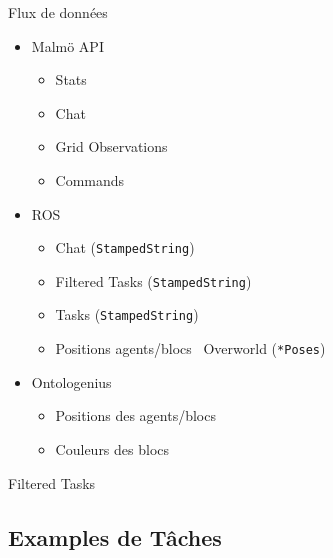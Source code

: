 \documentclass[aspectratio=169]{audition-beamer}
\begin{document}
\begin{frame}{Flux de données}

  \vfill
  \begin{itemize}
    \item Malmö API 
          \begin{itemize}[<.(2)->]
            \item Stats
            \item Chat
            \item Grid Observations
            \item Commands
          \end{itemize}
    \item ROS
          \begin{itemize}[<.(3)->]
            \item Chat (\texttt{StampedString})
            \item Filtered Tasks (\texttt{StampedString})
            \item Tasks (\texttt{StampedString})
            \item Positions agents/blocs \textrightarrow\ Overworld (\texttt{*Poses})
          \end{itemize}
    \item Ontologenius
          \begin{itemize}[<.(4)->]
            \item Positions des agents/blocs 
            \item Couleurs des blocs 
          \end{itemize}
  \end{itemize}

\end{frame}

\begin{frame}{Filtered Tasks}
\end{frame}

\subsection{Examples de Tâches}
\end{document}
